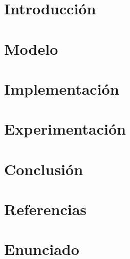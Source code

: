 \documentclass[a4paper]{article}
\begin{document}
\tableofcontents

\newpage
\section{Introducción}


\newpage
\section{Modelo}


\newpage
\section{Implementación}\label{Implementacion}


\newpage
\section{Experimentación}


\newpage
\section{Conclusión}
%

\newpage
%
\section{Referencias}
%

\newpage
\section{Enunciado}


\newpage
\appendix

\end{document}

